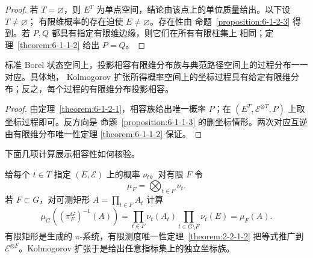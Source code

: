 \begin{proof}
若 $T=\varnothing$，则 $E^T$ 为单点空间，结论由该点上的单位质量给出。以下设 $T\ne\varnothing$；
有限维概率的存在迫使 $E\ne\varnothing$。存在性由
命题~\ref{proposition:6-1-2-3} 得到。若 $P,Q$ 都具有指定有限维边缘，则它们在所有有限柱集上
相同；定理~\ref{theorem:6-1-1-2} 给出 $P=Q$。
\end{proof}

\begin{corollary}[过程存在与分布的对应]\label{corollary:6-1-2-4}
标准 Borel 状态空间上，投影相容有限维分布族与典范路径空间上的过程分布一一对应。具体地，
Kolmogorov 扩张所得概率空间上的坐标过程具有给定有限维分布；反之，每个过程的有限维分布投影相容。
\end{corollary}

\begin{proof}
由定理~\ref{theorem:6-1-2-1}，相容族给出唯一概率 $P$；在
$(E^T,\mathcal E^{\otimes T},P)$ 上取坐标过程即可。反方向是
命题~\ref{proposition:6-1-1-3} 的删坐标情形。两次对应互逆由有限维分布唯一性定理
\ref{theorem:6-1-1-2} 保证。
\end{proof}

下面几项计算展示相容性如何核验。

\begin{example}[任意指标族的独立坐标]\label{ex:6-1-2-1}
给每个 $t\in T$ 指定 $(E,\mathcal E)$ 上的概率 $\nu_t$。对有限 $F$ 令
\[
 \mu_F=\bigotimes_{t\in F}\nu_t.
\]
若 $F\subset G$，对可测矩形 $A=\prod_{t\in F}A_t$ 计算
\[
 \mu_G((\pi_F^G)^{-1}(A))
 =\prod_{t\in F}\nu_t(A_t)\prod_{t\in G\setminus F}\nu_t(E)
 =\mu_F(A).
\]
有限矩形是生成的 $\pi$-系统，有限测度唯一性定理~\ref{theorem:2-2-1-2} 把等式推广到
$\mathcal E^{\otimes F}$。Kolmogorov 扩张于是给出任意指标集上的独立坐标族。
\end{example}

